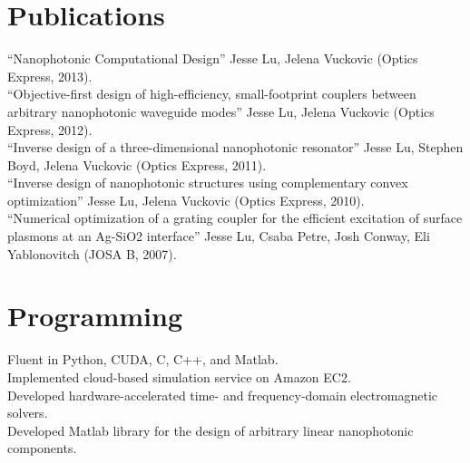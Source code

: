 \documentclass{res}
\begin{document}
\begin{resume}
\section{Publications}          
    ``Nanophotonic Computational Design'' Jesse Lu, Jelena Vuckovic (Optics Express, 2013). \\
    ``Objective-first design of high-efficiency, small-footprint couplers between arbitrary nanophotonic waveguide modes'' Jesse Lu, Jelena Vuckovic (Optics Express, 2012). \\
    ``Inverse design of a three-dimensional nanophotonic resonator'' Jesse Lu, Stephen Boyd, Jelena Vuckovic (Optics Express, 2011). \\
    ``Inverse design of nanophotonic structures using complementary convex optimization'' Jesse Lu, Jelena Vuckovic (Optics Express, 2010). \\
    ``Numerical optimization of a grating coupler for the efficient excitation of surface plasmons at an Ag-SiO2 interface'' Jesse Lu, Csaba Petre, Josh Conway, Eli Yablonovitch (JOSA B, 2007).
  
\section{Programming}          
    Fluent in Python, CUDA, C, C++, and Matlab. \\
    Implemented cloud-based simulation service on Amazon EC2. \\
    Developed hardware-accelerated time- and frequency-domain
        electromagnetic solvers. \\
    Developed Matlab library for the design of arbitrary linear nanophotonic components.


\end{resume}
\end{document}
